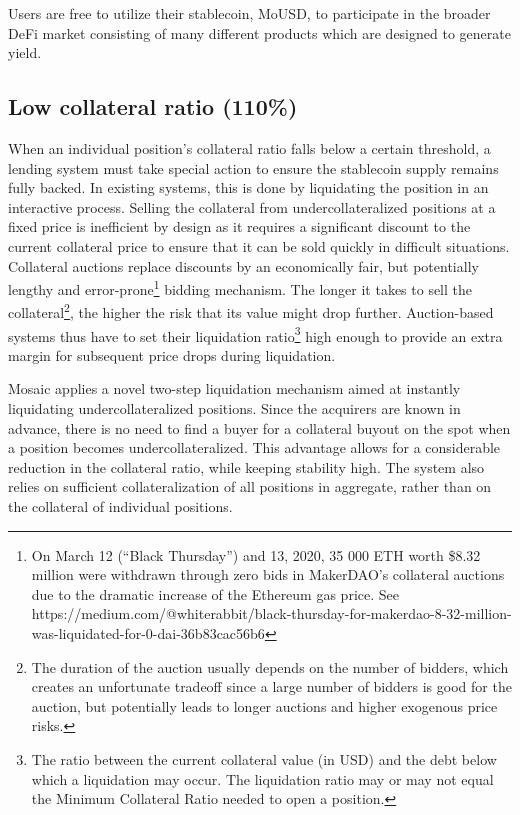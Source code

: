 \documentclass{article}
\begin{document}
Users are free to utilize their stablecoin, MoUSD, to participate in the broader DeFi market consisting of many different products which are designed to generate yield.

\subsection{Low collateral ratio (110\%)}
When an individual position’s collateral ratio falls below a certain threshold, a lending system must take special action to ensure the stablecoin supply remains fully backed. In existing systems, this is done by liquidating the position in an interactive process. Selling the collateral from undercollateralized positions at a fixed price is inefficient by design as it requires a significant discount to the current collateral price to ensure that it can be sold quickly in difficult situations. Collateral auctions replace discounts by an economically fair, but potentially lengthy and error-prone\footnote{On March 12 (“Black Thursday”) and 13, 2020, 35 000 ETH worth \$8.32 million were withdrawn through zero bids in MakerDAO’s collateral auctions due to the dramatic increase of the Ethereum gas price. See https://medium.com/@whiterabbit/black-thursday-for-makerdao-8-32-million-was-liquidated-for-0-dai-36b83cac56b6} bidding mechanism. The longer it takes to sell the collateral\footnote{The duration of the auction usually depends on the number of bidders, which creates an unfortunate tradeoff since a large number of bidders is good for the auction, but potentially leads to longer auctions and higher exogenous price risks.}, the higher the risk that its value might drop further. Auction-based systems thus have to set their liquidation ratio\footnote{The ratio between the current collateral value (in USD) and the debt below which a liquidation may occur. The liquidation ratio may or may not equal the Minimum Collateral Ratio needed to open a position.} high enough to provide an extra margin for subsequent price drops during liquidation.

Mosaic applies a novel two-step liquidation mechanism aimed at instantly liquidating undercollateralized positions. Since the acquirers are known in advance, there is no need to find a buyer for a collateral buyout on the spot when a position becomes undercollateralized. This advantage allows for a considerable reduction in the collateral ratio, while keeping stability high. The system also relies on sufficient collateralization of all positions in aggregate, rather than on the collateral of individual positions.
\end{document}

